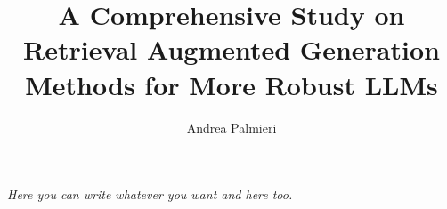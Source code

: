 \documentclass{styles/tthesis} %
\title{A Comprehensive Study on Retrieval Augmented Generation Methods for More Robust LLMs}
\author{Andrea Palmieri}
\begin{document}
\printfrontpage



\chapter*{\mbox{}}
\begin{flushright}
  \thispagestyle{empty}
  \null{}
  {\it Here you can write whatever you want
   \vspace{10pt}
   and here too.
  }
  \null
\end{flushright}
\thispagestyle{empty}
\mbox{}
\newpage



\tableofcontents

\mainmatter










\label{Bibliography}
\printbibliography
\end{document}

